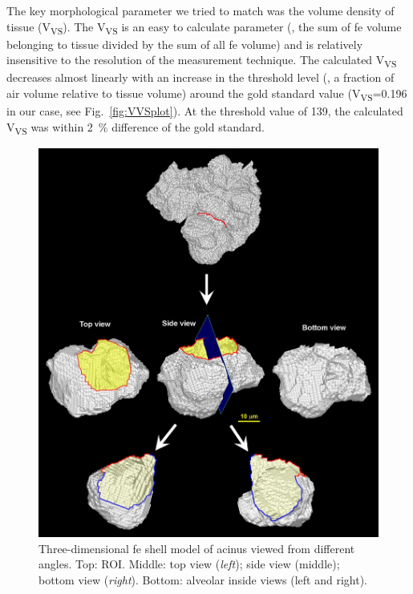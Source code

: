 The key morphological parameter we tried to match was the volume density of tissue (V\textsubscript{VS}). The V\textsubscript{VS} is an easy to calculate parameter (\ie, the sum of \ac{fe} volume belonging to tissue divided by the sum of all \ac{fe} volume) and is relatively insensitive to the resolution of the measurement technique. The calculated V\textsubscript{VS} decreases almost linearly with an increase in the threshold level (\ie, a fraction of air volume relative to tissue volume) around the gold standard value (V\textsubscript{VS}=0.196 in our case, see Fig.~\ref{fig:VVSplot}). At the threshold value of 139, the calculated V\textsubscript{VS} was within \SI{2}{\percent} difference of the gold standard.

\begin{figure}[p]
	\centering
	\includegraphics[width=\imsize]{img/Tsuda2008/Tsuda-10}
	\caption[Three-dimensional FE shell model of a partial acinus]{Three-dimensional \ac{fe} shell model of acinus viewed from different angles. Top: \ac{ROI}. Middle: top view (\textit{left}); side view (middle); bottom view (\textit{right}). Bottom: alveolar inside views (left and right).}
	\label{fig:alveolus}
\end{figure}

